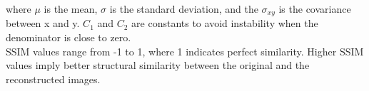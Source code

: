 \begin{enumerate}
    where $\mu$ is the mean, $\sigma$ is the standard deviation, and the $\sigma_{xy}$ is the covariance between x and y. $C_1$ and $C_2$ are constants to avoid instability when the denominator is close to zero. \\
    SSIM values range from -1 to 1, where 1 indicates perfect similarity. Higher SSIM values imply better structural similarity between the original and the reconstructed images.
\end{enumerate}